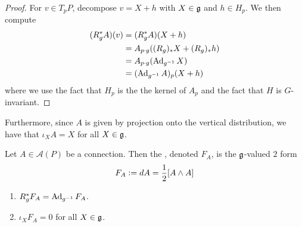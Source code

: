 %
\begin{proof}
For $v \in T_pP$, decompose $v = X + h$ with $X \in \mathfrak{g}$ and $h \in H_p$.
We then compute
\begin{align*}
(R_g^*A)(v) &= (R^*_gA)(X + h) \\
&= A_{p\cdot g}((R_g)_*X + (R_g)_*h) \\
&= A_{p\cdot g}(\operatorname{Ad}_{g^{-1}} X) \\
&= (\operatorname{Ad}_{g^{-1}}A)_p(X+h)
\end{align*}
where we use the fact that $H_p$ is the the kernel of $A_p$ and the fact that $H$
is $G$-invariant.
\end{proof}
%
Furthermore, since $A$ is given by projection onto the vertical distribution,
we have that $\iota_XA = X$ for all $X \in \mathfrak{g}$.
%
\begin{defn}
Let $A \in \mathscr{A}(P)$ be a connection. Then the ,
denoted $F_A$, is the $\mathfrak{g}$-valued $2$ form
\[
F_A \vcentcolon= dA = \frac{1}{2}[A \wedge A]
\]
\end{defn}
%
\begin{prop} \enumbreak
\begin{enumerate}
  \item $R^*_gF_A = \operatorname{Ad}_{g^{-1}}F_A$.
  \item $\iota_XF_A = 0$ for all $X \in \mathfrak{g}$.
\end{enumerate}
\end{prop}
%
